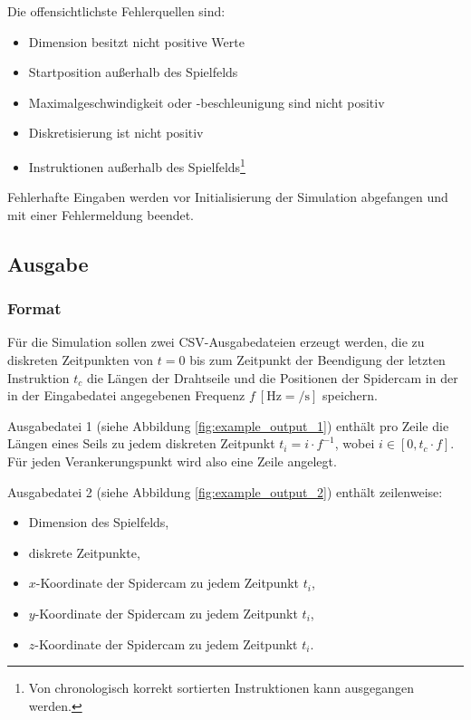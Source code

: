 Die offensichtlichste Fehlerquellen sind:

\begin{itemize}
    \item Dimension besitzt nicht positive Werte
    \item Startposition außerhalb des Spielfelds
    \item Maximalgeschwindigkeit oder -beschleunigung sind nicht positiv
    \item Diskretisierung ist nicht positiv
    \item Instruktionen außerhalb des Spielfelds\footnote{Von chronologisch korrekt sortierten Instruktionen kann ausgegangen werden.}
\end{itemize}

Fehlerhafte Eingaben werden vor Initialisierung der Simulation abgefangen und mit einer Fehlermeldung beendet.


\subsection{Ausgabe}
\label{ssec:ausgabe}


\subsubsection{Format}
\label{sssec:format}

Für die Simulation sollen zwei CSV-Ausgabedateien erzeugt werden, die zu diskreten Zeitpunkten von $t = 0$ bis zum Zeitpunkt der Beendigung der letzten Instruktion $t_c$ die Längen der Drahtseile und die Positionen der Spidercam in der in der Eingabedatei angegebenen Frequenz $f \ [\si{\hertz} = \si{\per\second}]$ speichern.

Ausgabedatei 1 (siehe Abbildung \ref{fig:example_output_1}) enthält pro Zeile die Längen eines Seils zu jedem diskreten Zeitpunkt $t_i = i \cdot f^{-1}$, wobei $i \in [0, t_c \cdot f]$.
Für jeden Verankerungspunkt wird also eine Zeile angelegt.

Ausgabedatei 2 (siehe Abbildung \ref{fig:example_output_2}) enthält zeilenweise:
\begin{itemize}
    \item Dimension des Spielfelds,
    \item diskrete Zeitpunkte,
    \item $x$-Koordinate der Spidercam zu jedem Zeitpunkt $t_i$,
    \item $y$-Koordinate der Spidercam zu jedem Zeitpunkt $t_i$,
    \item $z$-Koordinate der Spidercam zu jedem Zeitpunkt $t_i$.
\end{itemize}

